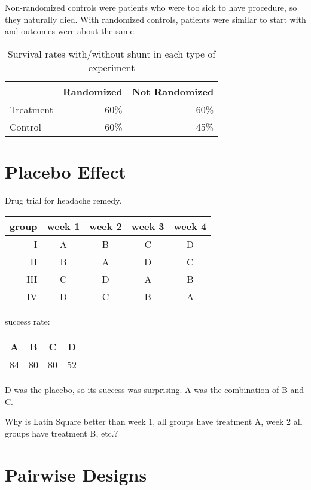 \documentclass[landscape]{exam}
\begin{document}
  Non-randomized controls were patients who were too sick to have procedure, so
  they naturally died.  With randomized controls, patients were similar to start
  with and outcomes were about the same.

  \begin{table}[H]
    \centering
    \begin{tabular}{lrr}
      \toprule
                & Randomized & Not Randomized \\
      \midrule
      Treatment & 60\%       & 60\% \\
      Control   & 60\%       & 45\% \\
      \bottomrule
    \end{tabular}
    \caption{Survival rates with/without shunt in each type of experiment}
  \end{table}

  \section{Placebo Effect}

  Drug trial for headache remedy.

  \begin{tabular}[H]{rcccc}
    \toprule
    group & week 1 & week 2 & week 3 & week 4 \\
    \midrule
    I     & A      & B      & C      & D \\
    II    & B      & A      & D      & C \\
    III   & C      & D      & A      & B \\
    IV    & D      & C      & B      & A \\
  \end{tabular}

  success rate:
  \begin{tabular}[H]{cccc}
    \toprule
    A  & B  & C  & D \\
    \midrule
    84 & 80 & 80 & 52 \\
    \bottomrule
  \end{tabular}

  D was the placebo, so its success was surprising.  A was the combination of B
  and C.

  Why is Latin Square better than week 1, all groups have treatment A, week 2
  all groups have treatment B, etc.?

  \section{Pairwise Designs}
\end{document}
